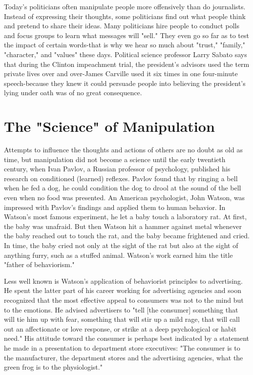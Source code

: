 \documentclass{book}
\begin{document}
Today’s politicians often manipulate people more offensively than do journalists. Instead of expressing their thoughts, some politicians find out what people think and pretend to share their ideas. Many politicians hire people to conduct polls and focus groups to learn what messages will "sell." They even go so far as to test the impact of certain words-that is why we hear so much about "trust," "family," "character," and "values" these days. Political science professor Larry Sabato says that during the Clinton impeachment trial, the president’s advisors used the term private lives over and over-James Carville used it six times in one four-minute speech-because they knew it could persuade people into believing the president’s lying under oath was of no great consequence.

\section{The "Science" of Manipulation}

Attempts to influence the thoughts and actions of others are no doubt as old as time, but manipulation did not become a science until the early twentieth century, when Ivan Pavlov, a Russian professor of psychology, published his research on conditioned (learned) reflexes. Pavlov found that by ringing a bell when he fed a dog, he could condition the dog to drool at the sound of the bell even when no food was presented. An American psychologist, John Watson, was impressed with Pavlov’s findings and applied them to human behavior. In Watson’s most famous experiment, he let a baby touch a laboratory rat. At first, the baby was unafraid. But then Watson hit a hammer against metal whenever the baby reached out to touch the rat, and the baby became frightened and cried. In time, the baby cried not only at the sight of the rat but also at the sight of anything furry, such as a stuffed animal. Watson’s work earned him the title "father of behaviorism."

Less well known is Watson’s application of behaviorist principles to advertising. He spent the latter part of his career working for advertising agencies and soon recognized that the most effective appeal to consumers was not to the mind but to the emotions. He advised advertisers to "tell [the consumer] something that will tie him up with fear, something that will stir up a mild rage, that will call out an affectionate or love response, or strike at a deep psychological or habit need." His attitude toward the consumer is perhaps best indicated by a statement he made in a presentation to department store executives: "The consumer is to the manufacturer, the department stores and the advertising agencies, what the green frog is to the physiologist."
\end{document}
